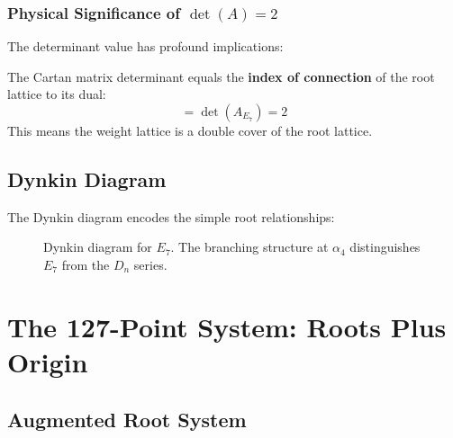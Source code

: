 \subsubsection{Physical Significance of $\det(A) = 2$}

The determinant value has profound implications:

\begin{proposition}
\label{prop:e7_index}
The Cartan matrix determinant equals the \textbf{index of connection} of the root lattice to its dual:
\begin{equation}
[\Lambda^*_{E_7} : \Lambda_{E_7}] = \det(A_{E_7}) = 2
\end{equation}
This means the weight lattice is a double cover of the root lattice.
\end{proposition}

\subsection{Dynkin Diagram}

The Dynkin diagram encodes the simple root relationships:

\begin{figure}[h]
\centering
{}
\caption{Dynkin diagram for $E_7$. The branching structure at $\alpha_4$ distinguishes $E_7$ from the $D_n$ series.}
\label{fig:e7_dynkin}
\end{figure}

\section{The 127-Point System: Roots Plus Origin}

\subsection{Augmented Root System}

